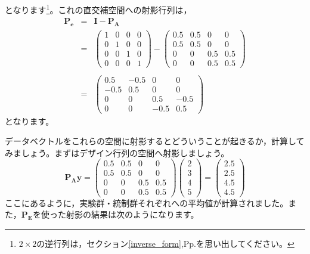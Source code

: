 \documentclass{ltjsbook}
\begin{document}
となります\footnote{$2\times 2$の逆行列は，セクション\ref{inverse_form},Pp.\pageref{inverse_form}を思い出してください。}。これの直交補空間への射影行列は，
\[
	\begin{array}{lll}
		\bm{P_e} & = & \bm{I} - \bm{P_A}                                                                               \\
		         & = & \begin{pmatrix} 1 & 0 & 0 & 0\\ 0 & 1 & 0 & 0\\0 & 0 & 1 & 0 \\0 & 0 & 0 & 1\end{pmatrix} -
		\begin{pmatrix} 0.5 & 0.5 & 0 & 0 \\ 0.5 & 0.5 & 0 & 0 \\ 0 & 0 & 0.5 & 0.5 \\ 0 & 0 & 0.5 & 0.5 \end{pmatrix} \\
		         &   &                                                                                                 \\
		         & = &
		\begin{pmatrix} 0.5 & -0.5 & 0 & 0 \\ -0.5 & 0.5 & 0 & 0 \\ 0 & 0 & 0.5 & -0.5 \\ 0 & 0 & -0.5 & 0.5 \end{pmatrix}
	\end{array}
\]
となります。

データベクトルをこれらの空間に射影するとどういうことが起きるか，計算してみましょう。まずはデザイン行列の空間へ射影しましょう。
\[
	\bm{P_A}\bm{y} = \begin{pmatrix} 0.5 & 0.5 & 0 & 0 \\ 0.5 & 0.5 & 0 & 0 \\ 0 & 0 & 0.5 & 0.5 \\ 0 & 0 & 0.5 & 0.5 \end{pmatrix}
	\begin{pmatrix} 2\\3\\4\\5 \end{pmatrix} =
	\begin{pmatrix} 2.5\\2.5\\4.5\\4.5 \end{pmatrix}
\]
ここにあるように，実験群・統制群それぞれへの平均値が計算されました。また，$\bm{P_E}$を使った射影の結果は次のようになります。
\end{document}
